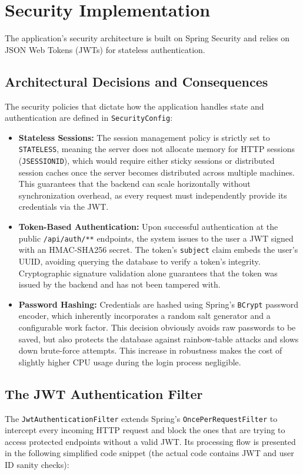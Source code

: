 \section{Security Implementation}
The application's security architecture is built on Spring Security and relies on JSON Web Tokens (JWTs) for stateless authentication.

\subsection{Architectural Decisions and Consequences}
The security policies that dictate how the application handles state and authentication are defined in \texttt{SecurityConfig}:

\begin{itemize}
    \item \textbf{Stateless Sessions:} The session management policy is strictly set to \texttt{STATELESS}, meaning the server does not allocate memory for HTTP sessions (\texttt{JSESSIONID}), which would require either sticky sessions or distributed session caches once the server becomes distributed across multiple machines. This guarantees that the backend can scale horizontally without synchronization overhead, as every request must independently provide its credentials via the JWT.
    \item \textbf{Token-Based Authentication:} Upon successful authentication at the public \texttt{/api/auth/**} endpoints, the system issues to the user a JWT signed with an HMAC-SHA256 secret. The token's \texttt{subject} claim embeds the user's UUID, avoiding querying the database to verify a token's integrity. Cryptographic signature validation alone guarantees that the token was issued by the backend and has not been tampered with.
    \item \textbf{Password Hashing:} Credentials are hashed using Spring's \texttt{BCrypt} password encoder, which inherently incorporates a random salt generator and a configurable work factor. This decision obviously avoids raw passwords to be saved, but also protects the database against rainbow-table attacks and slows down brute-force attempts. This increase in robustness makes the cost of slightly higher CPU usage during the login process negligible.
\end{itemize}

\subsection{The JWT Authentication Filter}
The \texttt{JwtAuthenticationFilter} extends Spring's \texttt{OncePerRequestFilter} to intercept every incoming HTTP request and block the ones that are trying to access protected endpoints without a valid JWT. Its processing flow is presented in the following simplified code snippet (the actual code contains JWT and user ID sanity checks):

